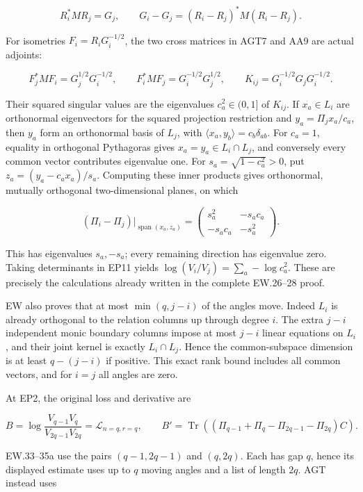 \[
R_i^*MR_j=G_j,\qquad
G_i-G_j=(R_i-R_j)^*M(R_i-R_j).
\tag{EP10}
\]

For isometries \(F_i=R_iG_i^{-1/2}\), the two cross matrices in AGT7 and AA9 are actual adjoints:

\[
F_j^*MF_i=G_j^{1/2}G_i^{-1/2},\qquad
F_i^*MF_j=G_i^{-1/2}G_j^{1/2},\qquad
K_{ij}=G_i^{-1/2}G_jG_i^{-1/2}.
\tag{EP11}
\]

Their squared singular values are the eigenvalues \(c_a^2\in(0,1]\) of \(K_{ij}\). If \(x_a\in L_i\) are orthonormal eigenvectors for the squared projection restriction and \(y_a=\Pi_jx_a/c_a\), then \(y_a\) form an orthonormal basis of \(L_j\), with \(\langle x_a,y_b\rangle=c_b\delta_{ab}\). For \(c_a=1\), equality in orthogonal Pythagoras gives \(x_a=y_a\in L_i\cap L_j\), and conversely every common vector contributes eigenvalue one. For \(s_a=\sqrt{1-c_a^2}>0\), put \(z_a=(y_a-c_ax_a)/s_a\). Computing these inner products gives orthonormal, mutually orthogonal two-dimensional planes, on which

\[
(\Pi_i-\Pi_j)|_{\operatorname{span}(x_a,z_a)}
=\begin{pmatrix}s_a^2&-s_ac_a\\-s_ac_a&-s_a^2\end{pmatrix}.
\tag{EP12}
\]

This has eigenvalues \(s_a,-s_a\); every remaining direction has eigenvalue zero. Taking determinants in EP11 yields \(\log(V_i/V_j)=\sum_a-\log c_a^2\). These are precisely the calculations already written in the complete EW.26--28 proof.

EW also proves that at most \(\min(q,j-i)\) of the angles move. Indeed \(L_i\) is already orthogonal to the relation columns up through degree \(i\). The extra \(j-i\) independent monic boundary columns impose at most \(j-i\) linear equations on \(L_i\), and their joint kernel is exactly \(L_i\cap L_j\). Hence the common-subspace dimension is at least \(q-(j-i)\) if positive. This exact rank bound includes all common vectors, and for \(i=j\) all angles are zero.

At EP2, the original loss and derivative are

\[
B=\log\frac{V_{q-1}V_q}{V_{2q-1}V_{2q}}
=\mathscr L_{n=q,r=q},\qquad
B'=\operatorname{Tr}((\Pi_{q-1}+\Pi_q-\Pi_{2q-1}-\Pi_{2q})C).
\tag{EP13}
\]

EW.33--35a use the pairs \((q-1,2q-1)\) and \((q,2q)\). Each has gap \(q\), hence its displayed estimate uses up to \(q\) moving angles and a list of length \(2q\). AGT instead uses

